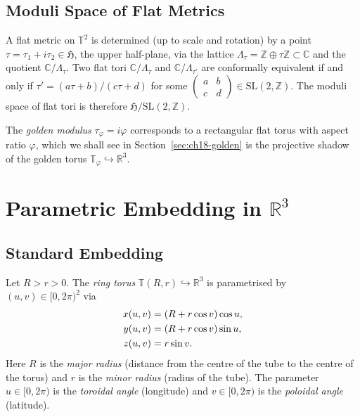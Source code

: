 \subsection{Moduli Space of Flat Metrics}\label{subsec:ch18-moduli}

A flat metric on $\mathbb{T}^2$ is determined (up to scale and rotation) by
a point $\tau = \tau_1 + i\tau_2 \in \mathfrak{H}$, the upper half-plane,
via the lattice $\Lambda_\tau = \mathbb{Z} \oplus \tau\mathbb{Z} \subset \mathbb{C}$
and the quotient $\mathbb{C}/\Lambda_\tau$.
Two flat tori $\mathbb{C}/\Lambda_\tau$ and $\mathbb{C}/\Lambda_{\tau'}$ are
conformally equivalent if and only if $\tau' = (a\tau+b)/(c\tau+d)$ for some
$\begin{pmatrix}a&b\\c&d\end{pmatrix} \in \mathrm{SL}(2,\mathbb{Z})$.
The moduli space of flat tori is therefore $\mathfrak{H}/\mathrm{SL}(2,\mathbb{Z})$.

The \emph{golden modulus} $\tau_\varphi = i\varphi$ corresponds to a rectangular
flat torus with aspect ratio $\varphi$, which we shall see in
Section~\ref{sec:ch18-golden} is the projective shadow of the golden torus
$\mathbb{T}_\varphi \hookrightarrow \mathbb{R}^3$.

\section{Parametric Embedding in \texorpdfstring{$\mathbb{R}^3$}{R3}}
\label{sec:ch18-parametric}

\subsection{Standard Embedding}\label{subsec:ch18-std-embed}

Let $R > r > 0$.
The \emph{ring torus} $\mathbb{T}(R,r) \hookrightarrow \mathbb{R}^3$ is parametrised by
$(u,v) \in [0,2\pi)^2$ via
\begin{align}\label{eq:torus-param}
  x(u,v) &= (R + r\cos v)\cos u, \notag\\
  y(u,v) &= (R + r\cos v)\sin u, \\
  z(u,v) &= r\sin v. \notag
\end{align}
Here $R$ is the \emph{major radius} (distance from the centre of the tube
to the centre of the torus) and $r$ is the \emph{minor radius} (radius of the tube).
The parameter $u \in [0,2\pi)$ is the \emph{toroidal angle} (longitude) and
$v \in [0,2\pi)$ is the \emph{poloidal angle} (latitude).

